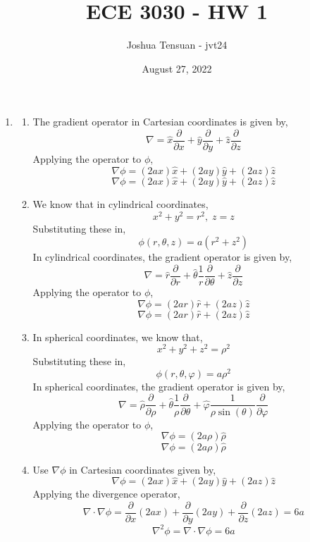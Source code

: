 \documentclass[12pt]{article}
\begin{document}
\usetikzlibrary{scopes}
\def\iangle{35} %

\def\down{-90}
\def\arcr{0.5cm} %


\title{ECE 3030 - HW 1}
\author{Joshua Tensuan - jvt24}
\date{August 27, 2022}
\maketitle


\begin{enumerate}
	\item [1.1]
	\begin{enumerate}
		\item [a.]
		The gradient operator in Cartesian coordinates is given by,
		\[\nabla = \hat x \frac{\partial}{\partial x} + \hat y \frac{\partial}{\partial y} + \hat z \frac{\partial}{\partial z}\]
		Applying the operator to $\phi$,
		\[\nabla \phi = (2ax)\hat x + (2ay )\hat y + (2az)\hat z\]
		\[\boxed{\nabla \phi = (2ax)\hat x + (2ay )\hat y + (2az)\hat z}\]

		\item [b.]
		We know that in cylindrical coordinates,
		\[x^2+y^2=r^2, \; z=z\]
		Substituting these in,
		\[\boxed{\phi(r,\theta, z)=a(r^2+z^2)}\]
		In cylindrical coordinates, the gradient operator is given by,
		\[\nabla = \hat r \frac{\partial}{\partial r}+\hat \theta \frac{1}{r}\frac{\partial}{\partial \theta} + \hat z \frac{\partial}{\partial z}\]
		Applying the operator to $\phi$,
		\[\nabla \phi = (2ar)\hat r + (2az)\hat z\]
		\[\boxed{\nabla \phi = (2ar)\hat r + (2az)\hat z}\]

		\item [c.]
		In spherical coordinates, we know that,
		\[x^2+y^2+z^2= \rho^2\]
		Substituting these in,
		\[\boxed{\phi(r,\theta, \varphi)=a\rho^2}\]
		In spherical coordinates, the gradient operator is given by,
		\[\nabla = \hat \rho \frac{\partial}{\partial \rho}+\hat \theta\frac{1}{\rho}\frac{\partial }{\partial \theta}+ \hat \varphi \frac{1}{\rho\sin(\theta)}\frac{\partial }{\partial \varphi}\]
		Applying the operator to $\phi$,
		\[\nabla \phi = (2a\rho)\hat \rho\]
		\[\boxed{\nabla \phi = (2a\rho)\hat \rho}\]

		\item [d.]
		Use $\nabla \phi$ in Cartesian coordinates given by,
		\[\nabla \phi = (2ax)\hat x + (2ay) \hat y + (2az)\hat z\]
		Applying the divergence operator,
		\[\nabla \cdot \nabla \phi = \frac{\partial}{\partial x}(2ax) + \frac{\partial }{\partial y}(2ay)+\frac{\partial}{\partial z}(2az)=6a\]
		\[\boxed{\nabla^2\phi=\nabla \cdot\nabla \phi=6a}\]
		


\end{enumerate}
\end{enumerate}
\end{document}
